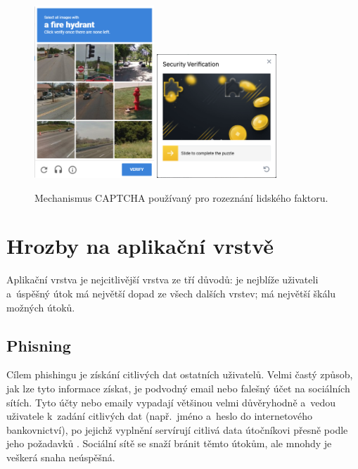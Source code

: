 \begin{figure}[hbt]
	\centering
	\includegraphics[width=0.4\textwidth]{images/captcha.png}
	\hspace{2em}
	\includegraphics[width=0.4\textwidth]{images/captcha2.png}
	\caption{Mechanismus CAPTCHA používaný pro rozeznání lidského faktoru.}
	\label{img:captcha}
\end{figure}

\section{Hrozby na aplikační vrstvě}
Aplikační vrstva je nejcitlivější vrstva ze tří důvodů: je nejblíže uživateli a~úspěšný útok má největší dopad ze všech dalších vrstev; má největší škálu možných útoků.

\subsection*{Phisning}
Cílem phishingu je získání citlivých dat ostatních uživatelů. Velmi častý způsob, jak lze tyto informace získat, je podvodný email nebo falešný účet na sociálních sítích. Tyto účty nebo emaily vypadají většinou velmi důvěryhodně a~vedou uživatele k~zadání citlivých dat (např.~jméno a~heslo do internetového bankovnictví), po jejichž vyplnění servírují citlivá data útočníkovi přesně podle jeho požadavků \cite{bib:kyber_utoky}. Sociální sítě se snaží bránit těmto útokům, ale mnohdy je veškerá snaha neúspěšná.

